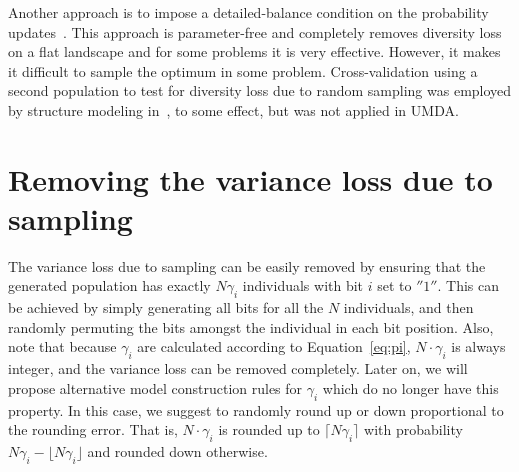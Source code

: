 \documentclass{acm_proc_article-sp}
\newcommand{\Np}{N}
\newcommand{\p}{\gamma}
\begin{document}
Another approach is to impose a detailed-balance condition on the probability
updates~\cite{Shapiro2003b,Shapiro2005}. This approach is parameter-free and
completely removes diversity loss on a flat landscape and for some problems it
is very effective. However, it makes it difficult to sample the optimum in
some problem. Cross-validation using a second population to test
for diversity loss due to random sampling was employed by structure modeling
in~\cite{Wu2006}, to some effect, but was not applied in UMDA.




\section{Removing the variance loss due to sampling}
\label{sec:generation}

The variance loss due to sampling can be easily removed by ensuring
that the generated population has exactly $\Np \p_i$ individuals with bit $i$ set
to $''1''$. This can be achieved by simply generating all bits for all the 
$\Np$ individuals, and then randomly permuting the bits amongst the individual
in each bit position.
Also, note that because $\p_i$ are calculated according to Equation~\ref{eq:pi},
$\Np \cdot \p_i$ is always integer, and the variance loss can be removed completely.
Later on, we will propose alternative model construction rules for $\p_i$ which do
no longer have this property. In this case, we suggest to randomly round up or down
proportional to the rounding error. That is, $\Np \cdot \p_i$ is rounded up to
$\lceil \Np \p_i \rceil$ with probability $\Np \p_i - \lfloor \Np \p_i \rfloor$ and
rounded down otherwise. 
\end{document}
